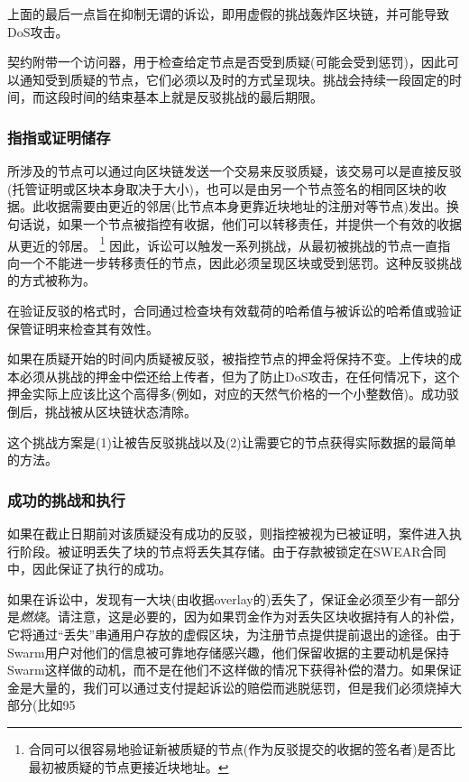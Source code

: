 上面的最后一点旨在抑制无谓的诉讼，即用虚假的挑战轰炸区块链，并可能导致DoS攻击。

契约附带一个访问器，用于检查给定节点是否受到质疑(可能会受到惩罚)，因此可以通知受到质疑的节点，它们必须以及时的方式呈现块。挑战会持续一段固定的时间，而这段时间的结束基本上就是反驳挑战的最后期限。 


\subsubsection{指指或证明储存}


所涉及的节点可以通过向区块链发送一个交易来反驳质疑，该交易可以是直接反驳(托管证明或区块本身取决于大小)，也可以是由另一个节点签名的相同区块的收据。此收据需要由更近的邻居(比节点本身更靠近块地址的注册对等节点)发出。换句话说，如果一个节点被指控有收据，他们可以转移责任，并提供一个有效的收据从更近的邻居。%
%
\footnote{合同可以很容易地验证新被质疑的节点(作为反驳提交的收据的签名者)是否比最初被质疑的节点更接近块地址。}
%
因此，诉讼可以触发一系列挑战，从最初被挑战的节点一直指向一个不能进一步转移责任的节点，因此必须呈现区块或受到惩罚。这种反驳挑战的方式被称为。 

在验证反驳的格式时，合同通过检查块有效载荷的哈希值与被诉讼的哈希值或验证保管证明来检查其有效性。 

如果在质疑开始的时间内质疑被反驳，被指控节点的押金将保持不变。上传块的成本必须从挑战的押金中偿还给上传者，但为了防止DoS攻击，在任何情况下，这个押金实际上应该比这个高得多(例如，对应的天然气价格的一个小整数倍)。成功驳倒后，挑战被从区块链状态清除。

这个挑战方案是(1)让被告反驳挑战以及(2)让需要它的节点获得实际数据的最简单的方法。

\subsubsection{成功的挑战和执行}

如果在截止日期前对该质疑没有成功的反驳，则指控被视为已被证明，案件进入执行阶段。被证明丢失了块的节点将丢失其存储。由于存款被锁定在SWEAR合同中，因此保证了执行的成功。

如果在诉讼中，发现有一大块(由收据overlay的)丢失了，保证金必须至少有一部分是\emph{燃烧}。请注意，这是必要的，因为如果罚金作为对丢失区块收据持有人的补偿，它将通过“丢失”串通用户存放的虚假区块，为注册节点提供提前退出的途径。由于Swarm用户对他们的信息被可靠地存储感兴趣，他们保留收据的主要动机是保持Swarm这样做的动机，而不是在他们不这样做的情况下获得补偿的潜力。如果保证金是大量的，我们可以通过支付提起诉讼的赔偿而逃脱惩罚，但是我们必须烧掉大部分(比如95%

